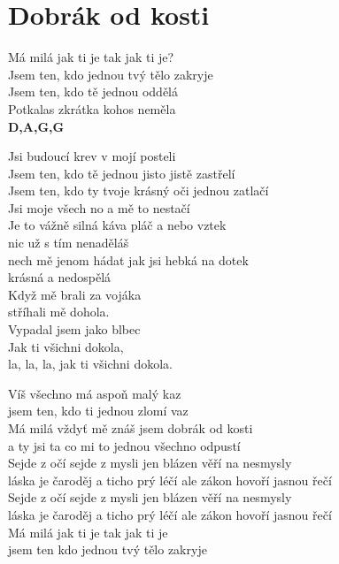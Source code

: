 \section{Dobrák od kosti}
\onehalfspacing

 Má milá  jak ti je tak  jak ti je? \\
 Jsem ten, kdo  jednou tvý  tělo zakryje \\
 Jsem ten,  kdo tě jednou  oddělá  \\
 Potkalas  zkrátka  kohos neměla  \\
\textbf{D,A,G,G}

 Jsi budoucí  krev  v mojí posteli \\
 Jsem ten, kdo tě  jednou jisto  jistě zastřelí \\
 Jsem ten, kdo ty  tvoje krásný oči jednou  zatlačí  \\
 Jsi moje všech  no a mě to  nestačí  \\

{} Je to vážně silná káva  pláč a nebo vztek\\
 nic už s tím nenaděláš \\
 nech mě jenom hádat  jak jsi hebká na dotek \\
 krásná a nedospělá\\

Když mě brali za vojáka\\
stříhali mě dohola.\\
Vypadal jsem jako blbec\\
Jak ti všichni dokola, \\
la, la, la, jak ti všichni dokola.\\

\begin{multicols}{2}
\singlespacing

\sloka{}
Víš všechno má aspoň malý kaz \\
jsem ten, kdo ti jednou zlomí vaz\\
Má milá vždyť mě znáš jsem dobrák od kosti\\
a ty jsi ta co mi to jednou všechno odpustí\\

Sejde z očí sejde z mysli jen blázen věří na nesmysly \\
láska je čaroděj a ticho prý léčí ale zákon hovoří jasnou řečí \\

Sejde z očí sejde z mysli jen blázen věří na nesmysly \\
láska je čaroděj a ticho prý léčí ale zákon hovoří jasnou řečí \\

{}
Má milá jak ti je tak jak ti je\\
jsem ten kdo jednou tvý tělo zakryje \\

\end{multicols}